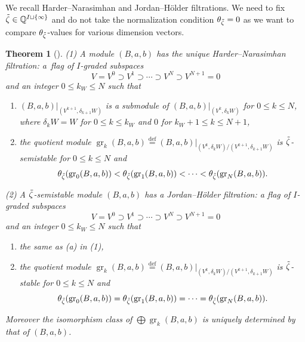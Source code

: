 \documentclass[11pt]{article}
\newenvironment{aenume}{%
  \begin{enumerate}%
  \renewcommand{\theenumi}{\alph{enumi}}%
  \renewcommand{\labelenumi}{\textup{(\theenumi)}}%
  }{\end{enumerate}}
\newtheorem{Theorem}[equation]{Theorem}
\theoremstyle{definition}
\numberwithin{equation}{section}
\newcommand{\defeq}{\overset{\operatorname{\scriptstyle def}}{=}}
\newcommand{\Q}{{\mathbb Q}}
\newcommand{\gr}{\operatorname{gr}} %
\begin{document}
We recall Harder--Narasimhan and Jordan--H\"older f\/iltrations. We need
to f\/ix $\Tilde\zeta\in \Q^{I\sqcup\{\infty\}}$ and do not take the
normalization condition $\theta_{\Tilde\zeta} = 0$ as we want to
compare $\theta_{\Tilde\zeta}$-values for various dimension vectors.

\begin{Theorem}[\cite{Rudakov}]\label{thm:Rudakov}
\textup{(1)} A module $(B,a,b)$ has the unique Harder--Narasimhan
filtration\textup:
a~flag of $I$-graded subspaces
\begin{equation*}
  V = V^0 \supset V^1 \supset \cdots \supset V^N \supset V^{N+1} = 0
\end{equation*}
and an integer $0 \le k_W \le N$ such that
\begin{aenume}\itemsep=0pt
\item $(B,a,b)|_{(V^{k+1}, \delta_{k+1} W)}$ is a submodule of
  $(B,a,b)|_{(V^k,\delta_k W)}$ for $0\le k \le N$,
where $\delta_k W = W$ for $0\le k\le k_W$ and $0$
for $k_W + 1\le k \le N+1$,

\item the quotient module $\gr_k (B,a,b) \defeq
  (B,a,b)|_{(V^k,\delta_k W)/(V^{k+1},\delta_{k+1} W)}$ is
  $\Tilde\zeta$-semistable for $0\le k\le N$ and
\[
    \theta_{\Tilde\zeta}(\gr_0(B,a,b))
    < \theta_{\Tilde\zeta}(\gr_1(B,a,b)) < \cdots
    < \theta_{\Tilde\zeta}(\gr_N(B,a,b)).
\]
\end{aenume}

\textup{(2)} A $\Tilde\zeta$-semistable module $(B,a,b)$ has a
Jordan--H\"older filtration\textup:
a f\/lag of $I$-graded subspaces
\begin{equation*}
  V = V^0 \supset V^1 \supset \cdots \supset V^N \supset V^{N+1} = 0
\end{equation*}
and an integer $0 \le k_W \le N$ such that
\begin{aenume}\itemsep=0pt
\item the same as \textup{(a)} in \textup{(1)},

\item the quotient module $\gr_k (B,a,b)\defeq (B,a,b)|_{(V^k,\delta_k
    W)/(V^{k+1},\delta_{k+1} W)}$ is $\Tilde\zeta$-stable for $0\le
  k\le N$ and
\[
    \theta_{\Tilde\zeta}(\gr_0(B,a,b))
    = \theta_{\Tilde\zeta}(\gr_1(B,a,b)) = \cdots
    = \theta_{\Tilde\zeta}(\gr_N(B,a,b)).
\]
\end{aenume}
Moreover the isomorphism class of $\bigoplus \gr_k(B,a,b)$ is uniquely
determined by that of $(B,a,b)$.
\end{Theorem}
\end{document}

